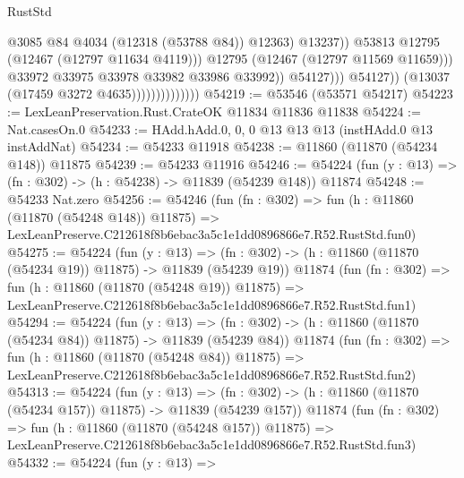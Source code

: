 \begin{lexlean}{RustStd}
\begin{coremodule}
                                                    @3085
                                                    @84
                                                    @4034
                                                    (@12318 (@53788 @84))
                                                    @12363)
                                                  @13237))
                                              @53813
                                              @12795
                                              (@12467 (@12797 @11634 @4119)))
                                            @12795
                                            (@12467 (@12797 @11569 @11659)))
                                          @33972
                                          @33975
                                          @33978
                                          @33982
                                          @33986
                                          @33992))
                                      @54127)))
                                @54127))
                            (@13037 (@17459 @3272 @4635))))))))))))))
@54219 := @53546 (@53571 @54217)
@54223 := LexLeanPreservation.Rust.CrateOK @11834 @11836 @11838
@54224 := Nat.casesOn.{0}
@54233 := HAdd.hAdd.{0, 0, 0} @13 @13 @13 (instHAdd.{0} @13 instAddNat)
@54234 := @54233 @11918
@54238 := @11860 (@11870 (@54234 @148)) @11875
@54239 := @54233 @11916
@54246 := @54224 (fun (y : @13) => (fn : @302) -> (h : @54238) -> @11839 (@54239 @148)) @11874
@54248 := @54233 Nat.zero
@54256 := @54246
    (fun (fn : @302) =>
    fun (h : @11860 (@11870 (@54248 @148)) @11875) =>
    LexLeanPreserve.C212618f8b6ebac3a5c1e1dd0896866e7.R52.RustStd.fun0)
@54275 := @54224
    (fun (y : @13) =>
    (fn : @302) -> (h : @11860 (@11870 (@54234 @19)) @11875) -> @11839 (@54239 @19))
    @11874
    (fun (fn : @302) =>
    fun (h : @11860 (@11870 (@54248 @19)) @11875) =>
    LexLeanPreserve.C212618f8b6ebac3a5c1e1dd0896866e7.R52.RustStd.fun1)
@54294 := @54224
    (fun (y : @13) =>
    (fn : @302) -> (h : @11860 (@11870 (@54234 @84)) @11875) -> @11839 (@54239 @84))
    @11874
    (fun (fn : @302) =>
    fun (h : @11860 (@11870 (@54248 @84)) @11875) =>
    LexLeanPreserve.C212618f8b6ebac3a5c1e1dd0896866e7.R52.RustStd.fun2)
@54313 := @54224
    (fun (y : @13) =>
    (fn : @302) -> (h : @11860 (@11870 (@54234 @157)) @11875) -> @11839 (@54239 @157))
    @11874
    (fun (fn : @302) =>
    fun (h : @11860 (@11870 (@54248 @157)) @11875) =>
    LexLeanPreserve.C212618f8b6ebac3a5c1e1dd0896866e7.R52.RustStd.fun3)
@54332 := @54224
    (fun (y : @13) =>

\end{coremodule}
\end{lexlean}
